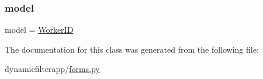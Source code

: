 \subsubsection{\texorpdfstring{model}{model}}
{\footnotesize\ttfamily model = \hyperlink{classdynamicfilterapp_1_1models_1_1_worker_i_d}{Worker\+ID}\hspace{0.3cm}{\ttfamily [static]}}



The documentation for this class was generated from the following file\+:\begin{DoxyCompactItemize}
\item 
dynamicfilterapp/\hyperlink{forms_8py}{forms.\+py}\end{DoxyCompactItemize}
